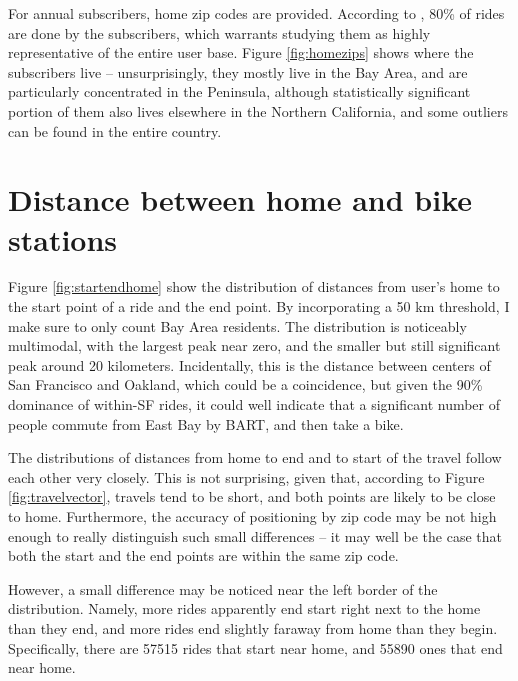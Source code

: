 \documentclass{article}
\begin{document}
For annual subscribers, home zip codes are provided. According to \cite{babs}, 80\% of rides are done by the subscribers, which warrants studying them as highly representative of the entire user base. Figure \ref{fig:homezips} shows where the subscribers live -- unsurprisingly, they mostly live in the Bay Area, and are particularly concentrated in the Peninsula, although statistically significant portion of them also lives elsewhere in the Northern California, and some outliers can be found in the entire country.

\section{Distance between home and bike stations}

Figure \ref{fig:startendhome} show the distribution of distances from user's home to the start point of a ride and the end point. By incorporating a 50 km threshold, I make sure to only count Bay Area residents. The distribution is noticeably multimodal, with the largest peak near zero, and the smaller but still significant peak around 20 kilometers. Incidentally, this is the distance between centers of San Francisco and Oakland, which could be a coincidence, but given the 90\% dominance of within-SF rides, it could well indicate that a significant number of people commute from East Bay by BART, and then take a bike.

The distributions of distances from home to end and to start of the travel follow each other very closely. This is not surprising, given that, according to Figure \ref{fig:travelvector}, travels tend to be short, and both points are likely to be close to home. Furthermore, the accuracy of positioning by zip code may be not high enough to really distinguish such small differences -- it may well be the case that both the start and the end points are within the same zip code.

However, a small difference may be noticed near the left border of the distribution. Namely, more rides apparently end start right next to the home than they end, and more rides end slightly faraway from home than they begin. Specifically, there are 57515 rides that start near home, and 55890 ones that end near home.
\end{document}
